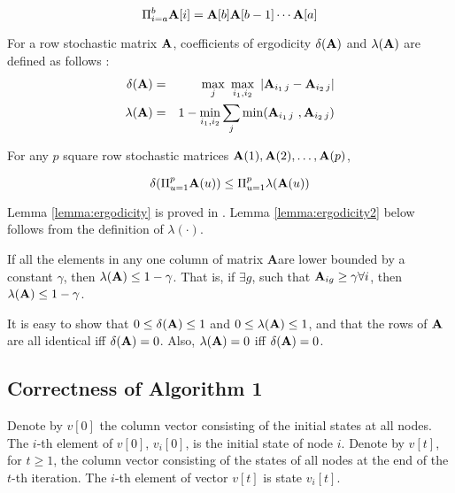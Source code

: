 \documentclass{llncs}
\newcommand{\bfA}{{\bf A}}
\begin{document}
\begin{equation}
\label{backward}
\Pi_{i=a}^b \bfA[i] = \bfA[b]\bfA[b-1]\cdots\bfA[a]
\end{equation}


For a row stochastic matrix $\bfA$,
 coefficients of ergodicity $\delta(\bfA)$ and $\lambda(\bfA)$ are defined as
follows \cite{Wolfowitz}:
\begin{eqnarray*}
\delta(\bfA) & = &   \max_j ~ \max_{i_1,i_2}~ | \bfA_{i_1\,j}-\bfA_{i_2\,j} | \label{e_zelta} \\
\lambda(\bfA) & = & 1 - \min_{i_1,i_2} \sum_j \min(\bfA_{i_1\,j} ~, \bfA_{i_2\,j}) \label{e_lambda}
\end{eqnarray*}


\begin{lemma}
\label{lemma:ergodicity}
For any $p$ square row stochastic matrices $\bfA(1), \bfA(2), \dots, \bfA(p)$,

\begin{equation*}
\delta(\Pi_{u=1}^p \bfA(u)) \leq \Pi_{u=1}^p \lambda(\bfA(u))
\end{equation*}
\end{lemma}

Lemma \ref{lemma:ergodicity} is proved in \cite{Hajnal58}. Lemma \ref{lemma:ergodicity2} below follows from the definition of $\lambda(\cdot)$.

\begin{lemma}
\label{lemma:ergodicity2}
If all the elements in any one column of matrix \bfA are lower bounded by a constant $\gamma$, then $\lambda(\bfA) \leq 1 - \gamma$. That is, if $\exists g$, such that $\bfA_{ig} \geq \gamma \forall i$, then $\lambda(\bfA) \leq 1 - \gamma$.
\end{lemma}

It is easy to show that  $0\leq \delta(\bfA) \leq 1$ and $0\leq \lambda(\bfA) \leq 1$, and that the rows
of $\bfA$ are all identical iff $\delta(\bfA)=0$. Also, $\lambda(\bfA) = 0$ iff $\delta(\bfA) = 0$.



\subsection{Correctness of Algorithm 1}
Denote by $v[0]$ the column vector consisting of the initial states at all nodes. The $i$-th element of $v[0]$, $v_i[0]$, is the initial state of node $i$. Denote by $v[t]$, for $t \geq 1$, the column vector consisting of the states of all nodes at the end
of the $t$-th iteration. The $i$-th element of vector $v[t]$ is state $v_i[t]$. 
\end{document}
